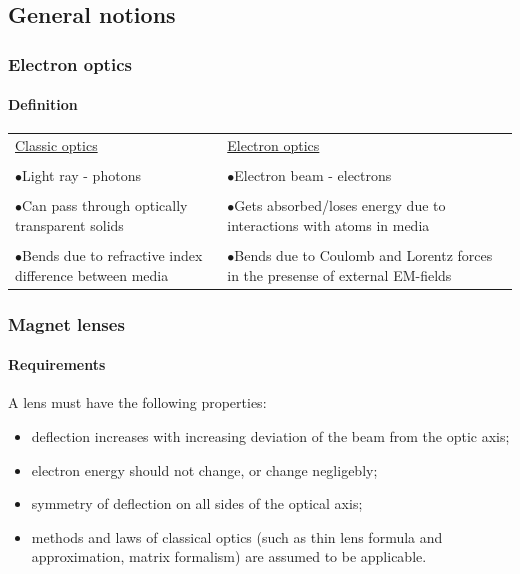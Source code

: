 \documentclass[10pt]{beamer}
\newcommand{\bull}{$\bullet$}
\newcommand{\rfn}{\setcounter{footnote}{0}}
\begin{document}
\subsection{General notions}
\begin{frame}
  \frametitle{Electron optics}
  \rfn
  \framesubtitle{Definition}
  \begin{table}[t]
    \centering
    \begin{tabular}{   m{5cm}  m{5cm}  }
    \underline{Classic optics} & \underline{Electron optics} \\
    & \\
    \bull Light ray - photons &  \bull Electron beam - electrons  \\
    & \\
    \bull Can pass through optically transparent solids  & \bull  Gets absorbed/loses energy due to interactions with atoms in media \\
    & \\
    \bull Bends due to refractive index difference between media & \bull  Bends due to Coulomb and Lorentz forces in the presense of external EM-fields \\
    \end{tabular}
  \end{table}
\end{frame}

\begin{frame}
  \frametitle{Magnet lenses}
  \framesubtitle{Requirements}
  \rfn
  A lens must have the following properties:
  \vspace{0.15cm}
  \begin{itemize}
    \item deflection increases with increasing deviation of the beam from the optic axis;
    \vspace{0.15cm}
    \item electron energy should not change, or change negligebly;
    \vspace{0.15cm}
    \item symmetry of deflection on all sides of the optical axis;
    \vspace{0.15cm}
    \item methods and laws of classical optics (such as thin lens formula and approximation, matrix formalism) are assumed to be applicable.
  \end{itemize}
\end{frame}
\end{document}
